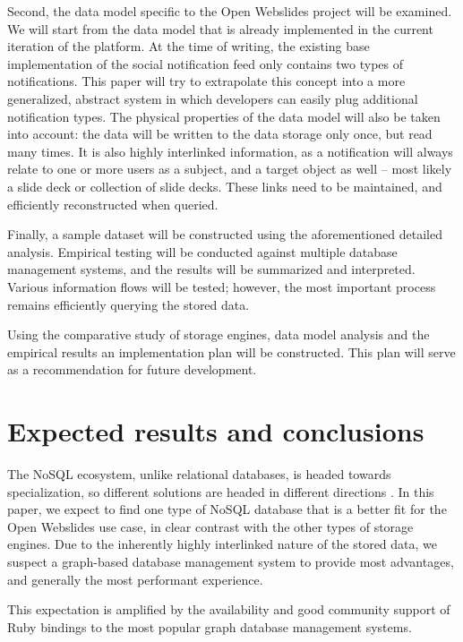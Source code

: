 Second, the data model specific to the Open Webslides project will be examined. We will start from the data model that is already implemented in the current iteration of the platform. At the time of writing, the existing base implementation of the social notification feed only contains two types of notifications. This paper will try to extrapolate this concept into a more generalized, abstract system in which developers can easily plug additional notification types.
The physical properties of the data model will also be taken into account: the data will be written to the data storage only once, but read many times. It is also highly interlinked information, as a notification will always relate to one or more users as a subject, and a target object as well -- most likely a slide deck or collection of slide decks. These links need to be maintained, and efficiently reconstructed when queried.

Finally, a sample dataset will be constructed using the aforementioned detailed analysis. Empirical testing will be conducted against multiple database management systems, and the results will be summarized and interpreted. Various information flows will be tested; however, the most important process remains efficiently querying the stored data.

Using the comparative study of storage engines, data model analysis and the empirical results an implementation plan will be constructed. This plan will serve as a recommendation for future development.

\section{Expected results and conclusions}
\label{sec:expected_results_and_conclusions}

The NoSQL ecosystem, unlike relational databases, is headed towards specialization, so different solutions are headed in different directions \autocite{Maroo2013}. In this paper, we expect to find one type of NoSQL database that is a better fit for the Open Webslides use case, in clear contrast with the other types of storage engines. Due to the inherently highly interlinked nature of the stored data, we suspect a graph-based database management system to provide most advantages, and generally the most performant experience.

This expectation is amplified by the availability and good community support of Ruby bindings to the most popular graph database management systems.

